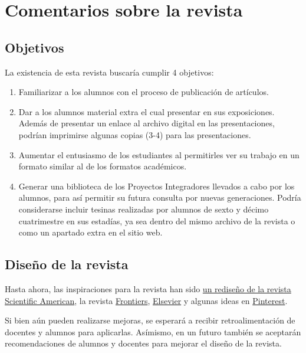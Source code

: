     \chapter{Comentarios sobre la revista}
    
\section{Objetivos}

La existencia de esta revista buscaría cumplir 4 objetivos:

\begin{enumerate}
    \item Familiarizar a los alumnos con el proceso de publicación de artículos.
    \item Dar a los alumnos material extra el cual presentar en sus exposiciones.
        \subitem Además de presentar un enlace al archivo digital en las presentaciones, podrían imprimirse algunas copias (3-4) para las presentaciones.
    \item Aumentar el entusiasmo de los estudiantes al permitirles ver su trabajo en un formato similar al de los formatos académicos.
    \item Generar una biblioteca de los Proyectos Integradores llevados a cabo por los alumnos, para así permitir su futura consulta por nuevas generaciones.
        \subitem Podría considerarse incluir tesinas realizadas por alumnos de sexto y décimo cuatrimestre en sus estadías, ya sea dentro del mismo archivo de la revista o como un apartado extra en el sitio web.
\end{enumerate}

\section{Diseño de la revista}

Hasta ahora, las inspiraciones para la revista han sido \href{https://www.pentagram.com/work/scientific-american?rel=sector&rel-id=3}{un rediseño de la revista Scientific American}, la revista \href{https://www.frontiersin.org/journals/sustainability/articles/10.3389/frsus.2026.1818134/pdf}{Frontiers}, \href{https://www.sciencedirect.com/science/article/pii/S1198743X26000650/pdfft?pid=1-s2.0-S1198743X26000650-main.pdf}{Elsevier} y algunas ideas en \href{https://pin.it/3s68QTUbZ}{Pinterest}.

Si bien aún pueden realizarse mejoras, se esperará a recibir retroalimentación de docentes y alumnos para aplicarlas. Asímismo, en un futuro también se aceptarán recomendaciones de alumnos y docentes para mejorar el diseño de la revista.

